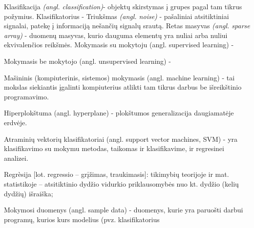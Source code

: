 Klasifikacija \textit{(angl. classification)}- objektų skirstymas į grupes pagal tam tikrus požymius.
Klasifikatorius - 
Triukšmas \textit{(angl. noise)} - pašaliniai atsitiktiniai signalai, patekę į informaciją nešančių signalų srautą.
Retas masyvas \textit{(angl. sparse array)} - duomenų masyvas, kurio dauguma elementų yra nuliai arba nuliui ekvivalenčios reikšmės.
Mokymasis su mokytoju (angl. supervised learning) - %

Mokymasis be mokytojo (angl. unsupervised learning) - %

Mašininis\cite{mamcenko08} (kompiuterinis, sistemos\cite{martisiute08})
mokymasis (angl. machine learning) - tai mokslas siekiantis įgalinti
kompiuterius atlikti tam tikrus darbus be išreikštinio programavimo.

Hiperplokštuma (angl. hyperplane) - plokštumos generalizacija daugiamatėje erdvėje.

Atraminių vektorių klasifikatoriai (angl. support vector machines, SVM) - yra
klasifikavimo su mokymu metodas, taikomas ir klasifikavime, ir regresinei
analizei.\cite{bernataviciene08}

Regrèsija [lot. regressio – grįžimas, traukimasis]: tikimybių teorijoje ir mat.
statistikoje – atsitiktinio dydžio vidurkio priklausomybės nuo kt. dydžio (kelių
dydžių) išraiška;\cite{tzz2010}

Mokymosi duomenys (angl. sample data) - duomenys,
kurie yra paruošti darbui programų, kurios kurs modelius (pvz.
klasifikatorius
